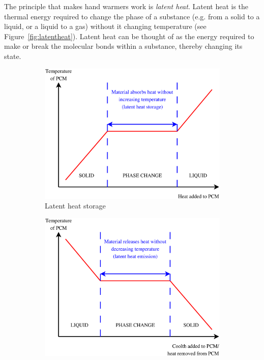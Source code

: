 The principle that makes hand warmers work is \emph{latent heat}.
Latent heat is the thermal energy required to change the phase of a substance (e.g. from a solid to a liquid, or a liquid to a gas) without it changing temperature (see Figure~\ref{fig:latentheat}).
Latent heat can be thought of as the energy required to make or break the molecular bonds within a substance, thereby changing its state.


\begin{figure}[htbp]
	\centering
	\begin{subfigure}{.49\textwidth}
		\centering
		\includegraphics[width=\textwidth]{figures/LatentHeatStorage.eps}
		\caption{Latent heat storage}
		\label{fig:latentheatstorage}
	\end{subfigure}
	\begin{subfigure}{.47\textwidth}
		\centering
		\includegraphics[width=\textwidth]{figures/LatentHeatEmission.eps}

\end{subfigure}
\end{figure}
